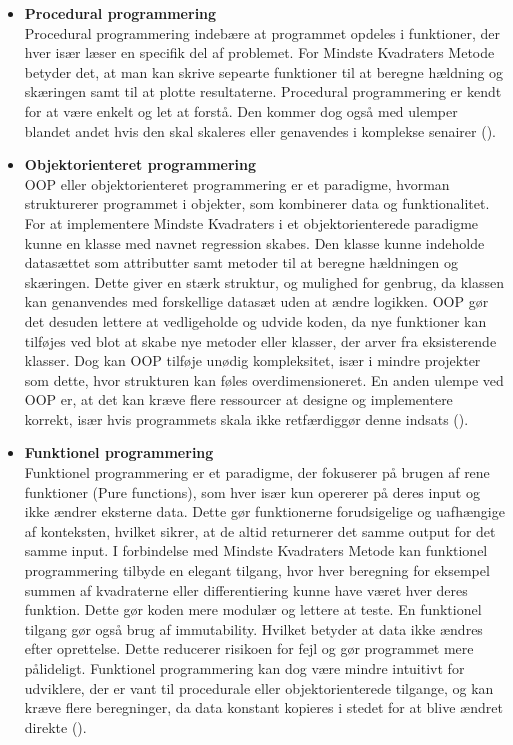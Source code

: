 \begin{itemize}
    \item \textbf{Procedural programmering} \\
    Procedural programmering indebære at programmet opdeles i funktioner, der hver især læser en specifik del af problemet. For Mindste Kvadraters Metode betyder det, at man kan skrive sepearte funktioner til at beregne hældning og skæringen samt til at plotte resultaterne. Procedural programmering er kendt for at være enkelt og let at forstå. Den kommer dog også med ulemper blandet andet hvis den skal skaleres eller genavendes i komplekse senairer (\cite{procedural}).

    \item \textbf{Objektorienteret programmering} \\
    OOP eller objektorienteret programmering er et paradigme, hvorman strukturerer programmet i objekter, som kombinerer data og funktionalitet. For at implementere Mindste Kvadraters i et objektorienterede paradigme kunne en klasse med navnet regression skabes. Den klasse kunne indeholde datasættet som attributter samt metoder til at beregne hældningen og skæringen. Dette giver en stærk struktur, og mulighed for genbrug, da klassen kan genanvendes med forskellige datasæt uden at ændre logikken. OOP gør det desuden lettere at vedligeholde og udvide koden, da nye funktioner kan tilføjes ved blot at skabe nye metoder eller klasser, der arver fra eksisterende klasser. Dog kan OOP tilføje unødig kompleksitet, især i mindre projekter som dette, hvor strukturen kan føles overdimensioneret. En anden ulempe ved OOP er, at det kan kræve flere ressourcer at designe og implementere korrekt, især hvis programmets skala ikke retfærdiggør denne indsats (\cite{OOP}).

    
    \item \textbf{Funktionel programmering} \\
    Funktionel programmering er et paradigme, der fokuserer på brugen af rene funktioner (Pure functions), som hver især kun opererer på deres input og ikke ændrer eksterne data. Dette gør funktionerne forudsigelige og uafhængige af konteksten, hvilket sikrer, at de altid returnerer det samme output for det samme input. I forbindelse med Mindste Kvadraters Metode kan funktionel programmering tilbyde en elegant tilgang, hvor hver beregning for eksempel summen af kvadraterne eller differentiering kunne have været hver deres funktion. Dette gør koden mere modulær og lettere at teste. En funktionel tilgang gør også brug af immutability. Hvilket betyder at data ikke ændres efter oprettelse. Dette reducerer risikoen for fejl og gør programmet mere pålideligt. Funktionel programmering kan dog være mindre intuitivt for udviklere, der er vant til procedurale eller objektorienterede tilgange, og kan kræve flere beregninger, da data konstant kopieres i stedet for at blive ændret direkte (\cite{functionalProgrammingParadigm}).  
\end{itemize}
